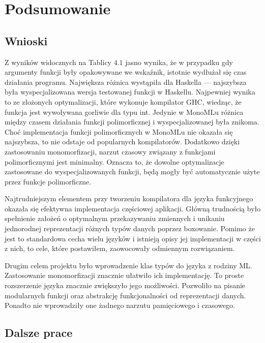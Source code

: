 \documentclass[declaration,shortabstract]{iithesis}
\begin{document}
\chapter{Podsumowanie}

\section{Wnioski}

Z wyników widocznych na Tablicy $4.1$ jasno wynika, że w przypadku gdy 
argumenty funkcji były opakowywane we wskaźnik, istotnie wydłużał się czas 
działania programu. Największa różnica wystąpiła dla Haskella --- najszybsza była 
wyspecjalizowana wersja testowanej funkcji w Haskellu. Najpewniej wynika to 
ze złożonych optymalizacji, które wykonuje kompilator GHC, wiedząc, że
funkcja jest wywoływana gorliwie dla typu int. Jedynie w MonoMLu różnica między 
czasem działania funkcji polimorficznej i wyspecjalizowanej była znikoma.
Choć implementacja funkcji polimorficznych w MonoMLu nie okazała się najszybsza, 
to nie odstaje od popularnych kompilatorów. Dodatkowo dzięki zastosowaniu 
monomorfizacji, narzut czasowy związany z funkcjami polimorficznymi jest 
minimalny. Oznacza to, że dowolne optymalizacje zastosowane do wyspecjalizowanych
funkcji, będą mogły być automatycznie użyte przez funkcje polimorficzne.

Najtrudniejszym elementem przy tworzeniu kompilatora dla języka funkcyjnego 
okazała się efektywna implementacja częściowej aplikacji. Główną trudnością
było spełnienie założeń o optymalnym przekazywaniu zmiennych i unikaniu 
jednorodnej reprezentacji różnych typów danych poprzez boxowanie. Pomimo że 
jest to standardowa cecha wielu języków i istnieją opisy jej implementacji
w części z nich, to cele, które postawiłem, zaowocowały odmiennym rozwiązaniem.

Drugim celem projektu było wprowadzenie klas typów do języka z rodziny ML. 
Zastosowanie monomorfizacji znacznie ułatwiło ich implementację. To proste
rozszerzenie języka znacznie zwiększyło jego możliwości. Pozwoliło na 
pisanie modularnych funkcji oraz abstrakcję funkcjonalności od reprezentacji 
danych. Ponadto nie wprowadziły one żadnego narzutu pamięciowego i czasowego.


\section{Dalsze prace}
\end{document}
